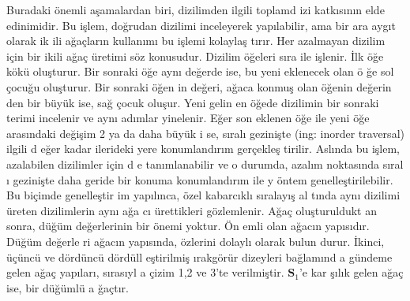 \documentclass[a4paper,10pt]{article}
\begin{document}
Buradaki \"onemli a\c{s}amalardan biri, dizilimden ilgili toplamd%
izi katk\i s\i n\i n elde edinimidir. Bu i\c{s}lem, do\u{g}rudan %
dizilimi inceleyerek yap\i labilir, ama bir ara ayg\i t olarak ik%
ili a\u{g}a\c{c}lar\i n kullan\i m{\i} bu i\c{s}lemi kolayla\c{s}%
t\i r\i r. Her azalmayan dizilim i\c{c}in bir ikili a\u{g}a\c{c} %
\"uretimi s\"oz konusudur. Dizilim \"o\u{g}eleri s{\i}\-ra i\-le %
i\c{s}lenir. \.Ilk \"o\u{g}e k\"ok\"u olu\c{s}turur. Bir sonraki %
\"o\u{g}e ayn{\i} de\u{g}erde ise, bu yeni ek\-le\-necek olan \"o%
\u{g}e sol \c{c}ocu\u{g}u olu\c{s}turur. Bir sonraki \"o\-\u{g}en%
in de\u{g}eri, a\u{g}aca konmu\c{s} olan \"o\u{g}enin de\u{g}erin%
den bir b\"uy\"uk ise, sa\u{g} \c{c}ocuk olu\c{s}ur. Ye\-ni gelin%
en \"o\u{g}ede dizilimin bir sonraki terimi incelenir ve ayn{\i} %
ad\i mlar yinelenir. E\u{g}er son eklenen \"o\u{g}e i\-le ye\-ni %
\"o\u{g}e aras\i ndaki de\u{g}i\c{s}im 2 ya da daha b\"u\-y\"uk i%
se, s\i ral{\i} gezini\c{s}te (ing: inorder traversal) ilgi\-li d%
e\u{g}er kadar ilerideki yere konumland\i r\i m ger\c{c}ekle\c{s}%
tirilir. Asl\i nda bu i\c{s}lem, azalabilen dizilimler i\c{c}in d%
e tan\i mlanabilir ve o durumda, azal\i m noktas\i nda s{\i}\-ral%
{\i} gezini\c{s}te daha geride bir konuma konumland\i r\i m ile y%
\"ontem genelle\c{s}tirilebilir. Bu bi\c{c}imde genelle\c{s}ti\-r%
im yap\i l\i nca, \"ozel kabarc\i kl{\i} s{\i}ra\-lay{\i}\c{s} al%
t{\i}nda ayn{\i} dizilimi \"ureten dizilimlerin ay\-n{\i} a\u{g}a%
c{\i} \"urettikleri g\"ozlemlenir. A\u{g}a\c{c} olu\c{s}turuldukt%
an sonra, d\"u\u{g}\"um de\u{g}erlerinin bir \"onemi yoktur. \"On%
emli olan a\u{g}ac\i n yap\i s\i d\i r. D\"u\u{g}\"um de\u{g}erle%
ri a\u{g}ac\i n yap\i s\i nda, \"ozlerini dolayl{\i} olarak bulun%
durur. \.Ikinci, \"u\c{c}\"unc\"u ve d\"ord\"unc\"u d\"or\-d\"ull%
e\c{s}tirilmi\c{s} \i rakg\"or\"ur dizeyleri ba\u{g}\-la\-m{\i}nd%
a g\"undeme gelen a\u{g}a\c{c} yap{\i}lar{\i}, s{\i}\-ra\-s{\i}yl%
a \c{c}izim 1,2 ve 3'te verilmi\c{s}\-tir. $\mathbf{S}_{1}$'e kar%
\c{s}\i l\i k gelen a\u{g}a\c{c} i\-se, bir d\"u\u{g}\"um\-l\"u a%
\u{g}a\c{c}t\i r. %
\end{document}

